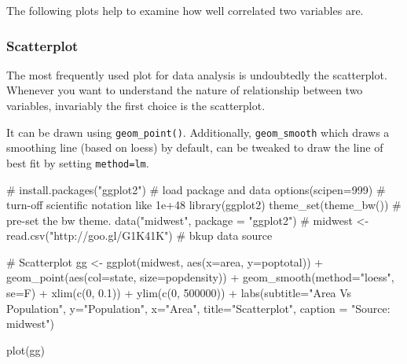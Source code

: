 \documentclass[a4paper]{article}
\newenvironment{Shaded}{}{}
\newcommand{\KeywordTok}[1]{\textcolor[rgb]{0.00,0.00,1.00}{#1}}
\newcommand{\DataTypeTok}[1]{#1}
\newcommand{\DecValTok}[1]{#1}
\newcommand{\FloatTok}[1]{#1}
\newcommand{\StringTok}[1]{\textcolor[rgb]{0.00,0.50,0.50}{#1}}
\newcommand{\CommentTok}[1]{\textcolor[rgb]{0.00,0.50,0.00}{#1}}
\newcommand{\OperatorTok}[1]{#1}
\newcommand{\NormalTok}[1]{#1}
\begin{document}
The following plots help to examine how well correlated two variables
are.

\subsubsection{Scatterplot}\label{scatterplot}

The most frequently used plot for data analysis is undoubtedly the
scatterplot. Whenever you want to understand the nature of relationship
between two variables, invariably the first choice is the scatterplot.

It can be drawn using \texttt{geom\_point()}. Additionally,
\texttt{geom\_smooth} which draws a smoothing line (based on loess) by
default, can be tweaked to draw the line of best fit by setting
\texttt{method=\textquotesingle{}lm\textquotesingle{}}.

\begin{Shaded}
\begin{Highlighting}[]
\CommentTok{# install.packages("ggplot2")}
\CommentTok{# load package and data}
\KeywordTok{options}\NormalTok{(}\DataTypeTok{scipen=}\DecValTok{999}\NormalTok{)  }\CommentTok{# turn-off scientific notation like 1e+48}
\KeywordTok{library}\NormalTok{(ggplot2)}
\KeywordTok{theme_set}\NormalTok{(}\KeywordTok{theme_bw}\NormalTok{())  }\CommentTok{# pre-set the bw theme.}
\KeywordTok{data}\NormalTok{(}\StringTok{"midwest"}\NormalTok{, }\DataTypeTok{package =} \StringTok{"ggplot2"}\NormalTok{)}
\CommentTok{# midwest <- read.csv("http://goo.gl/G1K41K")  # bkup data source}

\CommentTok{# Scatterplot}
\NormalTok{gg <-}\StringTok{ }\KeywordTok{ggplot}\NormalTok{(midwest, }\KeywordTok{aes}\NormalTok{(}\DataTypeTok{x=}\NormalTok{area, }\DataTypeTok{y=}\NormalTok{poptotal)) }\OperatorTok{+}\StringTok{ }
\StringTok{  }\KeywordTok{geom_point}\NormalTok{(}\KeywordTok{aes}\NormalTok{(}\DataTypeTok{col=}\NormalTok{state, }\DataTypeTok{size=}\NormalTok{popdensity)) }\OperatorTok{+}\StringTok{ }
\StringTok{  }\KeywordTok{geom_smooth}\NormalTok{(}\DataTypeTok{method=}\StringTok{"loess"}\NormalTok{, }\DataTypeTok{se=}\NormalTok{F) }\OperatorTok{+}\StringTok{ }
\StringTok{  }\KeywordTok{xlim}\NormalTok{(}\KeywordTok{c}\NormalTok{(}\DecValTok{0}\NormalTok{, }\FloatTok{0.1}\NormalTok{)) }\OperatorTok{+}\StringTok{ }
\StringTok{  }\KeywordTok{ylim}\NormalTok{(}\KeywordTok{c}\NormalTok{(}\DecValTok{0}\NormalTok{, }\DecValTok{500000}\NormalTok{)) }\OperatorTok{+}\StringTok{ }
\StringTok{  }\KeywordTok{labs}\NormalTok{(}\DataTypeTok{subtitle=}\StringTok{"Area Vs Population"}\NormalTok{, }
       \DataTypeTok{y=}\StringTok{"Population"}\NormalTok{, }
       \DataTypeTok{x=}\StringTok{"Area"}\NormalTok{, }
       \DataTypeTok{title=}\StringTok{"Scatterplot"}\NormalTok{, }
       \DataTypeTok{caption =} \StringTok{"Source: midwest"}\NormalTok{)}

\KeywordTok{plot}\NormalTok{(gg)}
\end{Highlighting}
\end{Shaded}
\end{document}
